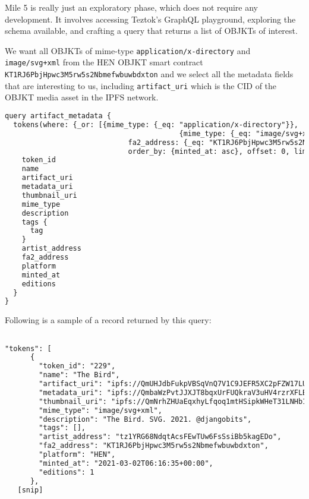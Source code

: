 Mile 5 is really just an exploratory phase, which does not require any development. It involves accessing Teztok's GraphQL playground\footnotemark[7], exploring the schema available, and crafting a query that returns a list of OBJKTs of interest.


We want all OBJKTs of mime-type \texttt{application/x-directory} and \\ \texttt{image/svg+xml} from the HEN OBJKT smart contract \\\texttt{KT1RJ6PbjHpwc3M5rw5s2Nbmefwbuwbdxton} and we select all the metadata fields that are interesting to us, including \texttt{artifact\_uri} which is the CID of the OBJKT media asset in the IPFS network.


\vspace{0.5cm}

\begin{lstlisting}[language=HTML, caption={GraphQL query to retrieve OBJKTs of interest}] 
query artifact_metadata {
  tokens(where: {_or: [{mime_type: {_eq: "application/x-directory"}},
    									 {mime_type: {_eq: "image/svg+xml"}}],
    						 fa2_address: {_eq: "KT1RJ6PbjHpwc3M5rw5s2Nbmefwbuwbdxton"}},
    						 order_by: {minted_at: asc}, offset: 0, limit: 10) {
    token_id
    name
    artifact_uri
    metadata_uri
    thumbnail_uri
    mime_type
    description
    tags {
      tag
    }
    artist_address
    fa2_address
    platform
    minted_at
    editions
  }
}
\end{lstlisting}


Following is a sample of a record returned by this query:


\vspace{0.5cm}

\begin{lstlisting}[language=HTML, caption={Sample OBJKT Record }] 

"tokens": [
      {
        "token_id": "229",
        "name": "The Bird",
        "artifact_uri": "ipfs://QmUHJdbFukpVBSqVnQ7V1C9JEFR5XC2pFZW17LUEpAtQnd",
        "metadata_uri": "ipfs://QmbaWzPvtJJXJT8bqxUrFUQkraV3uHV4rzrXFLBcJ18kH1",
        "thumbnail_uri": "ipfs://QmNrhZHUaEqxhyLfqoq1mtHSipkWHeT31LNHb1QEbDHgnc",
        "mime_type": "image/svg+xml",
        "description": "The Bird. SVG. 2021. @djangobits",
        "tags": [],
        "artist_address": "tz1YRG68NdqtAcsFEwTUw6FsSsiBb5kagEDo",
        "fa2_address": "KT1RJ6PbjHpwc3M5rw5s2Nbmefwbuwbdxton",
        "platform": "HEN",
        "minted_at": "2021-03-02T06:16:35+00:00",
        "editions": 1
      },
   [snip]
\end{lstlisting}




